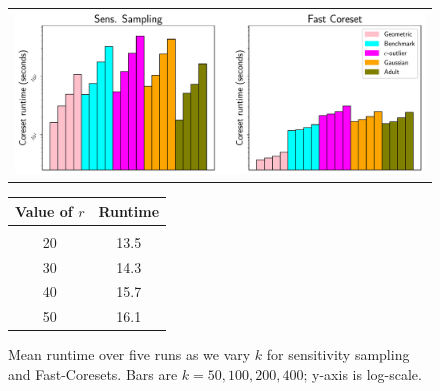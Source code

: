 \begin{figure}
\begin{minipage}{0.65\linewidth}
    \centering
    \begin{tabular}{c}
        \includegraphics[width=.95\linewidth]{images/2/coreset_runtime-Effect_of_k_for_sens_sampling.pdf}
    \end{tabular}
    \caption{Mean runtime over five runs as we vary $k$ for sensitivity sampling and Fast-Coresets. Bars are $k=50, 100, 200, 400$; y-axis is log-scale.}
    \label{fig:coreset_size_on_sens_quality}
\end{minipage}
\hspace{0.35cm}
\begin{minipage}{0.27\linewidth}
    \centering
    \begin{tabular}{cc}
        Value of $r$ & Runtime \\
        \hline
        \vspace*{-0.2cm}\\
        20 & 13.5 \\
        30 & 14.3 \\
        40 & 15.7 \\
        50 & 16.1 \\
    \end{tabular}
    \label{tbl:logdelta}
\end{minipage}
\end{figure}
